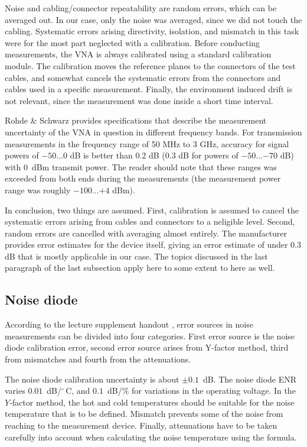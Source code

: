 \documentclass[a4paper, 12pt]{article}
\begin{document}
Noise and cabling/connector repeatability are random errors, which can be averaged 
out. In our case, only the noise was averaged, since we did not touch the cabling. 
Systematic errors arising directivity, isolation, and mismatch in this task were
for the most part neglected with a calibration. Before conducting measurements, 
the VNA is always calibrated using a standard calibration module. The calibration 
moves the reference planes to the connectors of the test cables, and somewhat 
cancels the systematic errors from the connectors and cables used in a specific 
measurement. Finally, the environment induced drift is not relevant, since the 
measurement was done inside a short time interval.

Rohde \& Schwarz provides specifications that describe the measurement uncertainty 
of the VNA in question in different frequency bands. For transmission measurements 
in the frequency range of 50 MHz to 3 GHz, accuracy for signal powers of $-50 \ldots 0$ 
dB is better than $0.2$ dB ($0.3$ dB for powers of $-50 \ldots {-70}$ dB) with 0~dBm 
transmit power. \cite{vna} The reader should note that these ranges was exceeded 
from both ends during the measurements (the measurement power range was roughly 
$-100 \ldots {+4}$ dBm). 

In conclusion, two things are assumed. First, calibration is assumed to cancel the 
systematic errors arising from cables and connectors to a neligible level. Second, 
random errors are cancelled with averaging almost entirely. The manufacturer provides 
error estimates for the device itself, giving an error estimate of under $0.3$ dB that 
is mostly applicable in our case. The topics discussed in the last paragraph of the 
last subsection apply here to some extent to here as well.


\subsection{Noise diode}

According to the lecture supplement handout \cite{kakkaa_huuleen}, error sources in noise 
measurements can be divided into four categories. First error source is the noise diode 
calibration error, second error source arises from Y-factor method, third from mismatches 
and fourth from the attenuations.

The noise diode calibration uncertainty is about $\pm0.1$~dB. The noise diode ENR varies 
$0.01$~dB/${}^\circ \mathrm{\,C}$, and $0.1$~dB/\% for variations in the operating voltage. 
In the $Y$-factor method, the hot and cold temperatures should be suitable for the noise 
temperature that is to be defined. Mismatch prevents some of the noise from reaching to 
the measurement device. Finally, attenuations have to be taken carefully into account when 
calculating the noise temperature using the formula.
\end{document}
